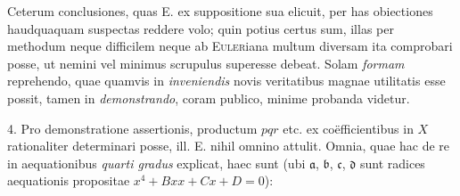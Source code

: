 \documentclass[14pt]{memoir}
\theoremstyle{plain}
\theoremstyle{remark}
\begin{document}
Ceterum conclusiones, quas \textsc{E.} ex suppositione sua elicuit, per has obiectiones haudquaquam suspectas reddere volo; quin potius certus sum, illas per methodum neque difficilem neque ab \textsc{Euler}iana multum diversam ita comprobari posse, ut nemini vel minimus scrupulus superesse debeat. Solam \textit{formam} reprehendo, quae quamvis in \textit{inveniendis} novis veritatibus magnae utilitatis esse possit, tamen in \textit{demonstrando}, coram publico, minime probanda videtur.

4. Pro demonstratione assertionis, productum \(pqr\) etc. ex co\"efficientibus in \(X\) rationaliter determinari posse, ill. \textsc{E.} nihil omnino attulit. Omnia, quae hac de re in aequationibus \textit{quarti gradus} explicat, haec sunt (ubi \(\mathfrak{a}\), \(\mathfrak{b}\), \(\mathfrak{c}\), \(\mathfrak{d}\) sunt radices aequationis propositae \(x^4 + B xx + C x + D = 0\)):
\end{document}

